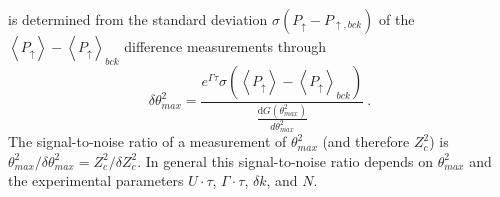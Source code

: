 \documentclass[aps,prl,onecolumn,superscriptaddress,floatfix]{revtex4-1}
\begin{document}
is determined from the standard deviation $\sigma\left(P_{\uparrow} - P_{\uparrow, bck}\right)$
of the $\left\langle P_{\uparrow}\right\rangle -\left\langle P_{\uparrow}\right\rangle _{bck}$
difference measurements through
\begin{equation}
\delta\theta_{max}^{2}=\frac{e^{\Gamma\tau}\sigma\left(\left\langle P_{\uparrow}\right\rangle -\left\langle P_{\uparrow}\right\rangle _{bck}\right)}{\frac{\mathrm{d}G\left(\theta_{max}^{2}\right)}{d\theta_{max}^{2}}}\:.\label{eq:delta theta^2}
\end{equation}
The signal-to-noise ratio of a measurement of $\theta_{max}^{2}$
(and therefore $Z_{c}^{2}$) is $\theta_{max}^{2}/\delta\theta_{max}^{2} = Z_{c}^{2}/\delta Z_{c}^{2}$.
In general this signal-to-noise ratio depends on $\theta_{max}^{2}$
and the experimental parameters $U\cdot\tau$, $\Gamma\cdot\tau$, $\delta k$, and $N$.
\end{document}
